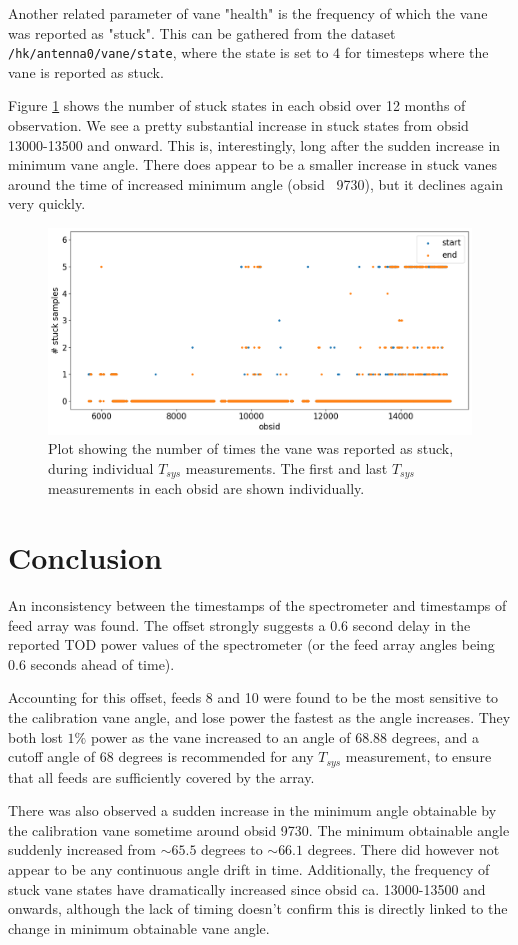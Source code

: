 \documentclass[10pt, a4paper]{article}
\begin{document}
Another related parameter of vane "health" is the frequency of which the vane was reported as "stuck". This can be gathered from the dataset \texttt{/hk/antenna0/vane/state}, where the state is set to $4$ for timesteps where the vane is reported as stuck. 

Figure \ref{fig:n_stuck} shows the number of stuck states in each obsid over 12 months of observation. We see a pretty substantial increase in stuck states from obsid 13000-13500 and onward. This is, interestingly, long after the sudden increase in minimum vane angle. There does appear to be a smaller increase in stuck vanes around the time of increased minimum angle (obsid ~9730), but it declines again very quickly.

\begin{figure}[H]
    \centering
    \includegraphics[scale=0.4]{../plots/n_stuck.png}
    \caption{Plot showing the number of times the vane was reported as stuck, during individual $T_{sys}$ measurements. The first and last $T_{sys}$ measurements in each obsid are shown individually.}
    \label{fig:n_stuck}
\end{figure}


\section{Conclusion}
An inconsistency between the timestamps of the spectrometer and timestamps of feed array was found. The offset strongly suggests a 0.6 second delay in the reported TOD power values of the spectrometer (or the feed array angles being 0.6 seconds ahead of time).

Accounting for this offset, feeds 8 and 10 were found to be the most sensitive to the calibration vane angle, and lose power the fastest as the angle increases. They both lost $1\%$ power as the vane increased to an angle of $68.88$ degrees, and a cutoff angle of $68$ degrees is recommended for any $T_{sys}$ measurement, to ensure that all feeds are sufficiently covered by the array.

There was also observed a sudden increase in the minimum angle obtainable by the calibration vane sometime around obsid 9730. The minimum obtainable angle suddenly increased from $\sim 65.5$ degrees to $\sim 66.1$ degrees. There did however not appear to be any continuous angle drift in time. Additionally, the frequency of stuck vane states have dramatically increased since obsid ca. 13000-13500 and onwards, although the lack of timing doesn't confirm this is directly linked to the change in minimum obtainable vane angle. 
\end{document}
